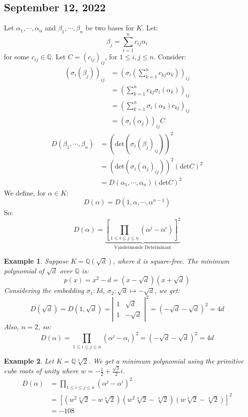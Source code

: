 \documentclass{article}
\newcommand{\Q}{\mathbb{Q}}
\newtheorem{example}{Example}
\begin{document}
\subsection{September 12, 2022}
Let $\alpha_1,\cdots, \alpha_n$ and $\beta_1,\cdots , \beta_n$ be two bases for $K$. Let:
$$\beta_j=\displaystyle\sum_{i=1}^nc_{ij}\alpha_i$$
for some $c_{ij}\in\Q$. Let $C=(c_{ij})_{ij}$, for $1\leq i,j\leq n$. Consider:
\begin{align*}
    (\sigma_i(\beta_j))_{ij}&=(\sigma_i\left(\sum_{k=1}^nc_{kj}\alpha_k\right))_{ij}\\
    &=\left(\sum_{k=1}^nc_{kj}\sigma_i(\alpha_k)\right)_{ij}\\
    &=\left(\sum_{k=1}^n\sigma_i(\alpha_k)c_{kj}\right)_{ij}\\
    &=(\sigma_i(\alpha_j))_{ij}C
\end{align*}
\begin{align*}
    D(\beta_1,\cdots , \beta_n)&=(\text{det}(\sigma_i(\beta_j)_{ij}))^2\\
    &=(\text{det}(\sigma_i(\alpha_j)_{ij}))^2(\text{det} C)^2\\
    &=D(\alpha_1,\cdots ,\alpha_n)(\text{det} C)^2
\end{align*}
We define, for $\alpha\in K$:
$$D(\alpha)=D(1,\alpha, \cdots ,\alpha^{n-1})$$
So:
$$D(\alpha)=\underbrace{\left[ \prod_{1\leq i\leq j\leq n} (\alpha^j-\alpha^i)\right]^2}_{\text{Vandermonde Determinant}}$$
\begin{example}
Suppose $K=\Q(\sqrt{d})$, where $d$ is square-free. The minimum polynomial of $\sqrt{d}$ over $\Q$ is:
$$p(x)=x^2-d = (x-\sqrt{d})(x+\sqrt{d})$$
Considering the embedding $\sigma_1: Id$, $\sigma_2: \sqrt{d}\mapsto -\sqrt{d}$, we get:
$$D(\sqrt{d})=D(1,\sqrt{d})=\left|\begin{array}{cc}
    1 & \sqrt{d} \\
    1 & -\sqrt{d}
\end{array}\right|^2=(-\sqrt{d}-\sqrt{d})^2=4d$$
Also, $n=2$, so:
$$D(\alpha)=\prod_{1\leq i\leq j\leq n}(\alpha^j-\alpha_i)^2 = (-\sqrt{d}-\sqrt{d})^2=4d$$
\end{example}
\begin{example}
Let $K=\Q\sqrt[3]{2}$. We get a minimum polynomial using the primitive cube roots of unity where $w=-\frac{1}{2}+\frac{\sqrt{3}}{2}i$.
\begin{align*}
    D(\alpha)&=\prod_{1\leq i\leq j\leq n}(\alpha^j-\alpha^i)^2\\
    &=[(w^2\sqrt[3]{2}-w\sqrt[3]{2})(w^2\sqrt[3]{2}-\sqrt[3]{2})(w\sqrt[3]{2}-\sqrt[3]{2})]^2\\
    &=-108
\end{align*}
\end{example}
\end{document}
